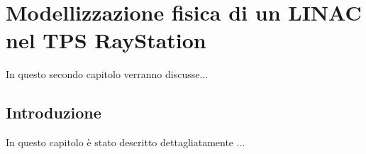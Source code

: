 \chapter{Modellizzazione f{}isica di un LINAC nel TPS RayStation}
\minitoc
\textsf{In questo secondo capitolo verranno discusse...}



\section{Introduzione}
In questo capitolo è stato descritto dettagliatamente ...




